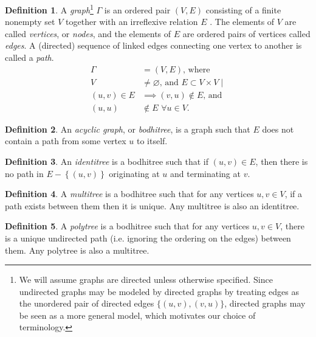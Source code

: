 \documentclass[pra,twocolumn,groupedaddress,10pt]{revtex4}
\theoremstyle{definition}
\newtheorem{defn}{Definition}[section]
\begin{document}
\begin{defn}
	A \emph{graph}\footnote{We will assume graphs are directed unless otherwise specified. Since undirected graphs may be modeled by directed graphs by treating edges as the unordered pair of directed edges $\{(u,v),(v,u)\}$\cite{chartrand}, directed graphs may be seen as a more general model, which motivates our choice of terminology.} $\Gamma$ is an ordered pair $(V, E)$ consisting of a finite nonempty set $V$ together with an irreflexive relation $E$ \cite{chartrand}. The elements of $V$ are called \emph{vertices}, or \emph{nodes}, and the elements of $E$ are ordered pairs of vertices called \emph{edges}. A (directed) sequence of linked edges connecting one vertex to another is called a \emph{path}.
	\begin{equation}
		\begin{split}
			\Gamma &= (V, E) \text{, where} \\
			V &\neq \varnothing \text{, and } E \subset V \times V \mid \\
			(u,v) \in E &\implies (v,u) \notin E \text{, and} \\
			(u,u) &\notin E \,\, \forall u \in V .
		\end{split}
		\nonumber
	\end{equation}
\end{defn}

\begin{defn}
	An \emph{acyclic graph}, or \emph{bodhitree}, is a graph such that $E$ does not contain a path from some vertex $u$ to itself.
\end{defn}

\begin{defn}
	An \emph{identitree} is a bodhitree such that if $(u, v) \in E$, then there is no path in $E - \left\{\left(u, v\right)\right\}$ originating at $u$ and terminating at $v$.
\end{defn}

\begin{defn}
	A \emph{multitree} is a bodhitree such that for any vertices $u, v \in V$, if a path exists between them then it is unique. Any multitree is also an identitree.
\end{defn}

\begin{defn}
	A \emph{polytree} is a bodhitree such that for any vertices $u, v \in V$, there is a unique undirected path (i.e. ignoring the ordering on the edges) between them. Any polytree is also a multitree.
\end{defn}
\end{document}
